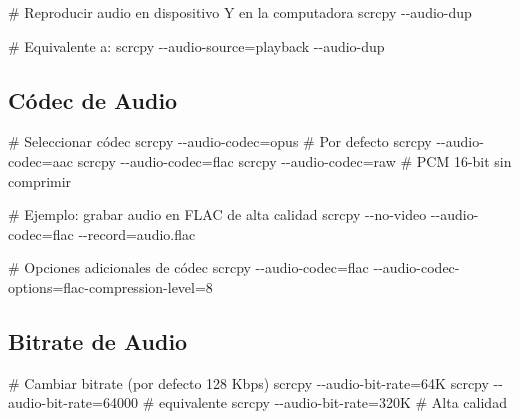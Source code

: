 \documentclass[
  doc,
  floatsintext,
  longtable,
  a4paper,
  nolmodern,
  notxfonts,
  notimes,
  12pt,
  colorlinks=true,linkcolor=blue,citecolor=blue,urlcolor=blue]{apa7}
\newenvironment{Shaded}{\begin{snugshade}}{\end{snugshade}}
\newcommand{\AttributeTok}[1]{\textcolor[rgb]{0.40,0.45,0.13}{#1}}
\newcommand{\CommentTok}[1]{\textcolor[rgb]{0.37,0.37,0.37}{#1}}
\newcommand{\ExtensionTok}[1]{\textcolor[rgb]{0.00,0.23,0.31}{#1}}
\newcommand{\NormalTok}[1]{\textcolor[rgb]{0.00,0.23,0.31}{#1}}
\newcommand{\OperatorTok}[1]{\textcolor[rgb]{0.37,0.37,0.37}{#1}}
\begin{document}
\begin{Shaded}
\begin{Highlighting}[]
\CommentTok{\# Reproducir audio en dispositivo Y en la computadora}
\ExtensionTok{scrcpy} \AttributeTok{{-}{-}audio{-}dup}

\CommentTok{\# Equivalente a:}
\ExtensionTok{scrcpy} \AttributeTok{{-}{-}audio{-}source}\OperatorTok{=}\NormalTok{playback }\AttributeTok{{-}{-}audio{-}dup}
\end{Highlighting}
\end{Shaded}

\subsection{Códec de Audio}\label{cuxf3dec-de-audio}

\begin{Shaded}
\begin{Highlighting}[]
\CommentTok{\# Seleccionar códec}
\ExtensionTok{scrcpy} \AttributeTok{{-}{-}audio{-}codec}\OperatorTok{=}\NormalTok{opus  }\CommentTok{\# Por defecto}
\ExtensionTok{scrcpy} \AttributeTok{{-}{-}audio{-}codec}\OperatorTok{=}\NormalTok{aac}
\ExtensionTok{scrcpy} \AttributeTok{{-}{-}audio{-}codec}\OperatorTok{=}\NormalTok{flac}
\ExtensionTok{scrcpy} \AttributeTok{{-}{-}audio{-}codec}\OperatorTok{=}\NormalTok{raw   }\CommentTok{\# PCM 16{-}bit sin comprimir}

\CommentTok{\# Ejemplo: grabar audio en FLAC de alta calidad}
\ExtensionTok{scrcpy} \AttributeTok{{-}{-}no{-}video} \AttributeTok{{-}{-}audio{-}codec}\OperatorTok{=}\NormalTok{flac }\AttributeTok{{-}{-}record}\OperatorTok{=}\NormalTok{audio.flac}

\CommentTok{\# Opciones adicionales de códec}
\ExtensionTok{scrcpy} \AttributeTok{{-}{-}audio{-}codec}\OperatorTok{=}\NormalTok{flac }\AttributeTok{{-}{-}audio{-}codec{-}options}\OperatorTok{=}\NormalTok{flac{-}compression{-}level=8}
\end{Highlighting}
\end{Shaded}

\subsection{Bitrate de Audio}\label{bitrate-de-audio}

\begin{Shaded}
\begin{Highlighting}[]
\CommentTok{\# Cambiar bitrate (por defecto 128 Kbps)}
\ExtensionTok{scrcpy} \AttributeTok{{-}{-}audio{-}bit{-}rate}\OperatorTok{=}\NormalTok{64K}
\ExtensionTok{scrcpy} \AttributeTok{{-}{-}audio{-}bit{-}rate}\OperatorTok{=}\NormalTok{64000  }\CommentTok{\# equivalente}
\ExtensionTok{scrcpy} \AttributeTok{{-}{-}audio{-}bit{-}rate}\OperatorTok{=}\NormalTok{320K   }\CommentTok{\# Alta calidad}
\end{Highlighting}
\end{Shaded}
\end{document}
